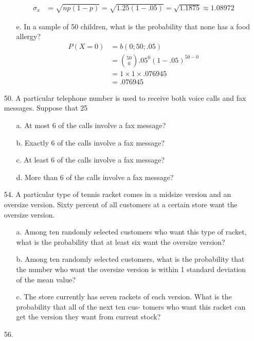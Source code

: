 \documentclass[letterpaper,12pt]{article}
\newcommand{\bp}[3]{%
  \binom{#2}{#1}#3^#1(1 - #3)^{#2 - #1}%
}
\begin{document}
\begin{enumerate}
\begin{enumerate}
\begin{align*}
          \sigma_x &= \sqrt{np(1 - p)} = \sqrt{1.25(1 - .05)} = \sqrt{1.1875} \approx 1.08972
        \end{align*}
      \item[e.]
        In a sample of 50 children, what is the probability that none has a food allergy?
        \begin{align*}
          P(X = 0) &= b(0; 50; .05) \\\
          &= \bp{0}{50}{.05} \\
          &= 1 \times 1 \times .076945 \\
          &= .076945
        \end{align*}
    \end{enumerate}
  \item[50.]
    A particular telephone number is used to receive both voice calls and fax messages. Suppose that 25%
    \begin{enumerate}
      \item[a.]
        At most 6 of the calls involve a fax message?
      \item[b.]
        Exactly 6 of the calls involve a fax message?
      \item[c.]
        At least 6 of the calls involve a fax message?
      \item[d.]
        More than 6 of the calls involve a fax message?
    \end{enumerate}
  \item[54.]
    A particular type of tennis racket comes in a midsize version and an oversize version. Sixty percent of all customers at a certain store want the oversize version.
    \begin{enumerate}
      \item[a.]
        Among ten randomly selected customers who want this type of racket, what is the probability that at least six want the oversize version?
      \item[b.]
        Among ten randomly selected customers, what is the probability that the number who want the oversize version is within 1 standard deviation of the mean value?
      \item[c.]
        The store currently has seven rackets of each version. What is the probability that all of the next ten cus- tomers who want this racket can get the version they want from current stock?
    \end{enumerate}
  \item[56.]

\end{enumerate}
\end{document}
